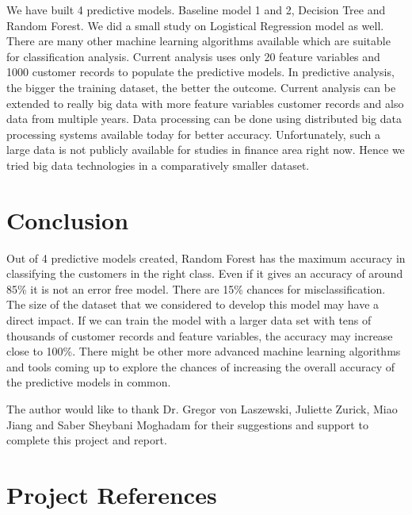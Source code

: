 \documentclass[sigconf]{acmart}
\begin{document}
We have built 4 predictive models. Baseline model 1 and 2, Decision Tree and Random Forest. We did a small study on Logistical Regression model as well. There are many other machine learning algorithms available which are suitable for classification analysis. Current analysis uses only 20 feature variables and 1000 customer records to populate the predictive models. In predictive analysis, the bigger the training dataset, the better the outcome. Current analysis can be extended to really big data with more feature variables customer records and also data from multiple years. Data processing can be done using distributed big data processing systems available today for better accuracy. Unfortunately, such a large data is not publicly available for studies in finance area right now. Hence we tried big data technologies in a comparatively smaller dataset. 


\section{Conclusion}

Out of 4 predictive models created, Random Forest has the maximum accuracy in classifying the customers in the right class. Even if it gives an accuracy of around 85\% it is not an error free model. There are 15\% chances for misclassification. The size of the dataset that we considered to develop this model may have a direct impact. If we can train the model with a larger data set with tens of thousands of customer records and feature variables, the accuracy may increase close to 100\%. There might be other more advanced machine learning algorithms and tools coming up to explore the chances of increasing the overall accuracy of the predictive models in common.


\begin{acks}

The author would like to thank Dr. Gregor von Laszewski, Juliette Zurick, Miao Jiang and Saber Sheybani Moghadam for their suggestions and support to complete this project and report.

\end{acks}


 

\appendix

\section{Project References}
\end{document}

